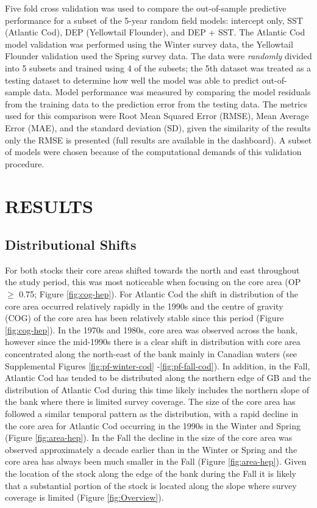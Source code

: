 \documentclass[
]{article}
\begin{document}
Five fold cross validation was used to compare the out-of-sample predictive performance for a subset of the 5-year random field models: intercept only, SST (Atlantic Cod), DEP (Yellowtail Flounder), and DEP + SST. The Atlantic Cod model validation was performed using the Winter survey data, the Yellowtail Flounder validation used the Spring survey data. The data were \emph{randomly} divided into 5 subsets and trained using 4 of the subsets; the 5th dataset was treated as a testing dataset to determine how well the model was able to predict out-of-sample data. Model performance was measured by comparing the model residuals from the training data to the prediction error from the testing data. The metrics used for this comparison were Root Mean Squared Error (RMSE), Mean Average Error (MAE), and the standard deviation (SD), given the similarity of the results only the RMSE is presented (full results are available in the dashboard). A subset of models were chosen because of the computational demands of this validation procedure.

\hypertarget{ref-results}{%
\section{RESULTS}\label{ref-results}}

\hypertarget{distributional-shifts}{%
\subsection{Distributional Shifts}\label{distributional-shifts}}

For both stocks their core areas shifted towards the north and east throughout the study period, this was most noticeable when focusing on the core area (OP \(\geq\) 0.75; Figure \ref{fig:cog-hep}). For Atlantic Cod the shift in distribution of the core area occurred relatively rapidly in the 1990s and the centre of gravity (COG) of the core area has been relatively stable since this period (Figure \ref{fig:cog-hep}). In the 1970s and 1980s, core area was observed across the bank, however since the mid-1990s there is a clear shift in distribution with core area concentrated along the north-east of the bank mainly in Canadian waters (see Supplemental Figures \ref{fig:pf-winter-cod} -\ref{fig:pf-fall-cod}). In addition, in the Fall, Atlantic Cod has tended to be distributed along the northern edge of GB and the distribution of Atlantic Cod during this time likely includes the northern slope of the bank where there is limited survey coverage. The size of the core area has followed a similar temporal pattern as the distribution, with a rapid decline in the core area for Atlantic Cod occurring in the 1990s in the Winter and Spring (Figure \ref{fig:area-hep}). In the Fall the decline in the size of the core area was observed approximately a decade earlier than in the Winter or Spring and the core area has always been much smaller in the Fall (Figure \ref{fig:area-hep}). Given the location of the stock along the edge of the bank during the Fall it is likely that a substantial portion of the stock is located along the slope where survey coverage is limited (Figure \ref{fig:Overview}).
\end{document}

